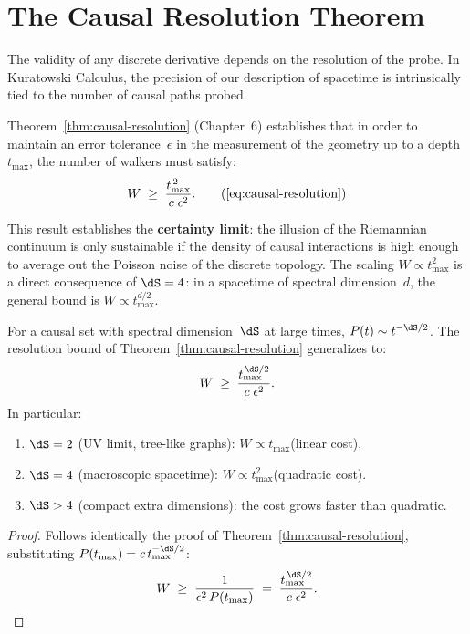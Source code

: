 \section{The Causal Resolution Theorem}

The validity of any discrete derivative depends on the resolution
of the probe. In Kuratowski Calculus, the precision of our
description of spacetime is intrinsically tied to the
number of causal paths probed.

Theorem~\ref{thm:causal-resolution} (Chapter~6) establishes that
in order to maintain an error tolerance~$\epsilon$ in the measurement
of the geometry up to a depth~$t_{\max}$, the number of
walkers must satisfy:
\begin{equation}
  W \;\geq\; \frac{t_{\max}^{\,2}}{c\;\epsilon^2}.
  \tag{\ref{eq:causal-resolution}}
\end{equation}

\noindent
This result establishes the \textbf{certainty limit}:
the illusion of the Riemannian continuum is only sustainable if the
density of causal interactions is high enough to
average out the Poisson noise of the discrete topology. The scaling
$W \propto t_{\max}^2$ is a direct consequence of $\dS = 4$:
in a spacetime of spectral dimension~$d$, the general bound
is $W \propto t_{\max}^{d/2}$.

\begin{theorem}
\label{thm:resolution-general}
For a causal set with spectral dimension~$\dS$ at large
times, $P(t) \sim t^{-\dS/2}$. The resolution bound of
Theorem~\ref{thm:causal-resolution} generalizes to:
\begin{equation}
  W \;\geq\; \frac{t_{\max}^{\,\dS/2}}{c\;\epsilon^2}.
  \label{eq:resolution-general}
\end{equation}
In particular:
\begin{enumerate}
  \item $\dS = 2$ (UV limit, tree-like graphs):
        $W \propto t_{\max}$\quad (linear cost).
  \item $\dS = 4$ (macroscopic spacetime):
        $W \propto t_{\max}^2$\quad (quadratic cost).
  \item $\dS > 4$ (compact extra dimensions):
        the cost grows faster than quadratic.
\end{enumerate}
\end{theorem}

\begin{proof}
Follows identically the proof of
Theorem~\ref{thm:causal-resolution}, substituting
$P(t_{\max}) = c\,t_{\max}^{-\dS/2}$:
\[
  W \;\geq\; \frac{1}{\epsilon^2\,P(t_{\max})}
  \;=\; \frac{t_{\max}^{\,\dS/2}}{c\;\epsilon^2}.
\]
\end{proof}

